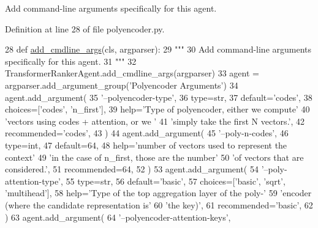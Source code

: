\begin{DoxyVerb}Add command-line arguments specifically for this agent.
\end{DoxyVerb}
 

Definition at line 28 of file polyencoder.\+py.


\begin{DoxyCode}
28     \textcolor{keyword}{def }\hyperlink{namespaceparlai_1_1agents_1_1drqa_1_1config_a62fdd5554f1da6be0cba185271058320}{add\_cmdline\_args}(cls, argparser):
29         \textcolor{stringliteral}{"""}
30 \textcolor{stringliteral}{        Add command-line arguments specifically for this agent.}
31 \textcolor{stringliteral}{        """}
32         TransformerRankerAgent.add\_cmdline\_args(argparser)
33         agent = argparser.add\_argument\_group(\textcolor{stringliteral}{'Polyencoder Arguments'})
34         agent.add\_argument(
35             \textcolor{stringliteral}{'--polyencoder-type'},
36             type=str,
37             default=\textcolor{stringliteral}{'codes'},
38             choices=[\textcolor{stringliteral}{'codes'}, \textcolor{stringliteral}{'n\_first'}],
39             help=\textcolor{stringliteral}{'Type of polyencoder, either we compute'}
40             \textcolor{stringliteral}{'vectors using codes + attention, or we '}
41             \textcolor{stringliteral}{'simply take the first N vectors.'},
42             recommended=\textcolor{stringliteral}{'codes'},
43         )
44         agent.add\_argument(
45             \textcolor{stringliteral}{'--poly-n-codes'},
46             type=int,
47             default=64,
48             help=\textcolor{stringliteral}{'number of vectors used to represent the context'}
49             \textcolor{stringliteral}{'in the case of n\_first, those are the number'}
50             \textcolor{stringliteral}{'of vectors that are considered.'},
51             recommended=64,
52         )
53         agent.add\_argument(
54             \textcolor{stringliteral}{'--poly-attention-type'},
55             type=str,
56             default=\textcolor{stringliteral}{'basic'},
57             choices=[\textcolor{stringliteral}{'basic'}, \textcolor{stringliteral}{'sqrt'}, \textcolor{stringliteral}{'multihead'}],
58             help=\textcolor{stringliteral}{'Type of the top aggregation layer of the poly-'}
59             \textcolor{stringliteral}{'encoder (where the candidate representation is'}
60             \textcolor{stringliteral}{'the key)'},
61             recommended=\textcolor{stringliteral}{'basic'},
62         )
63         agent.add\_argument(
64             \textcolor{stringliteral}{'--polyencoder-attention-keys'},

\end{DoxyCode}
